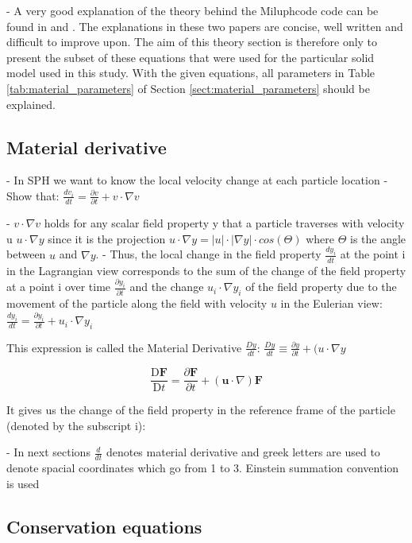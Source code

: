 - A very good explanation of the theory behind the Miluphcode code can be found in \cite{Schaefer_2016} and \cite{Schaefer_2020}. The explanations in these two papers are concise, well written and difficult to improve upon. The aim of this theory section is therefore only to present the subset of these equations that were used for  the particular solid model used in this study. With the given equations, all parameters in Table \ref{tab:material_parameters} of Section \ref{sect:material_parameters} should be explained.

\subsection{Material derivative}
- In SPH we want to know the local velocity change at each particle location
- Show that:
$ \frac{dv_i}{dt} = \frac{\partial v}{\partial t} + v \cdot \nabla v $

- $v \cdot \nabla v $ holds for any scalar field property y that a particle traverses with velocity u $u \cdot \nabla y $ since it is the projection $u \cdot \nabla y = |u|\cdot|\nabla y| \cdot cos (\Theta)$ where $\Theta$ is the angle between $u$ and $\nabla y$.
- Thus, the local change in the field property $\frac{dy_i}{dt}$ at the point i in the Lagrangian view corresponds to the sum of the change of the field property at a point i over time $\frac{\partial y_i}{\partial t}$ and the change $u_i \cdot \nabla y_i $ of the field property due to the movement of the particle along the field with velocity $u$ in the Eulerian view:
$ \frac{dy_i}{dt} = \frac{\partial y_i}{\partial t} + u_i \cdot \nabla y_i $

This expression is called the Material Derivative $\frac{Dy}{dt}$:
$ \frac{Dy}{dt} \equiv \frac{\partial y}{\partial t} + (u \cdot \nabla y $

\begin{equation}
    {\frac {\mathrm {D} \mathbf {F} }{\mathrm {D} t}}={\frac {\partial \mathbf {F} }{\partial t}}+\left(\mathbf {u} \cdot \nabla \right)\mathbf {F}
\end{equation}

It gives us the change of the field property in the reference frame of the particle (denoted by the subscript i):

- In next sections $\frac{d}{dt}$ denotes material derivative and greek letters are used to denote spacial coordinates which go from 1 to 3. Einstein summation convention is used
\subsection{Conservation equations}


